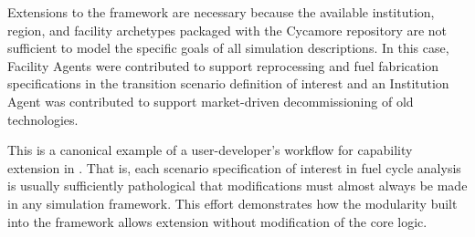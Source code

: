 Extensions to the \Cyclus framework are necessary because the available
institution, region, and facility archetypes packaged with the Cycamore
repository are not sufficient to model the specific goals of all simulation 
descriptions.  In this case, Facility Agents were contributed to support 
reprocessing and fuel fabrication specifications in the transition scenario
definition of interest and an Institution Agent was contributed to support 
market-driven decommissioning of old technologies.  


This is a canonical example of a user-developer's workflow for capability 
extension in \Cyclus. That is, each scenario specification of interest in fuel
cycle analysis is usually sufficiently pathological that modifications must
almost always be made in any simulation framework. This effort demonstrates how 
the modularity built into
the \Cyclus framework allows extension without modification of the core logic.  

